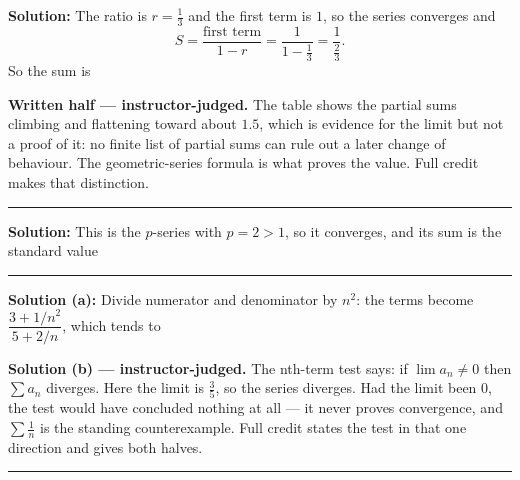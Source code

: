 \documentclass[12pt]{article}
\begin{document}



\textbf{Solution:} The ratio is $r = \frac{1}{3}$ and the first term is $1$, so the series converges and
\[ S = \frac{\text{first term}}{1 - r} = \frac{1}{1 - \frac{1}{3}} = \frac{1}{\frac{2}{3}}. \]
So the sum is 

\textbf{Written half --- instructor-judged.} The table shows the partial sums climbing and flattening toward about $1.5$, which is evidence for the limit but not a proof of it: no finite list of partial sums can rule out a later change of behaviour. The geometric-series formula is what proves the value. Full credit makes that distinction.

\vspace{0.2cm}\noindent\rule{\linewidth}{0.2pt}\vspace{0.2cm}


\textbf{Solution:} This is the $p$-series with $p = 2 > 1$, so it converges, and its sum is the standard value 

\vspace{0.2cm}\noindent\rule{\linewidth}{0.2pt}\vspace{0.2cm}


\textbf{Solution (a):} Divide numerator and denominator by $n^2$: the terms become $\dfrac{3 + 1/n^2}{5 + 2/n}$, which tends to 

\textbf{Solution (b) --- instructor-judged.} The nth-term test says: if $\lim a_n \neq 0$ then $\sum a_n$ diverges. Here the limit is $\frac{3}{5}$, so the series diverges. Had the limit been $0$, the test would have concluded nothing at all --- it never proves convergence, and $\sum \frac{1}{n}$ is the standing counterexample. Full credit states the test in that one direction and gives both halves.

\vspace{0.2cm}\noindent\rule{\linewidth}{0.2pt}\vspace{0.2cm}
\end{document}
